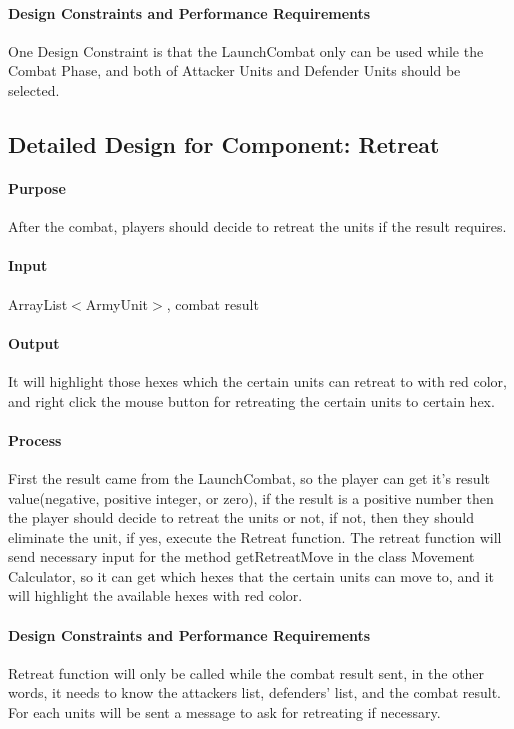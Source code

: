 \documentclass[12pt,a4paper,titlepage]{article}
\begin{document}
\paragraph{Design Constraints and Performance Requirements} 
One Design Constraint is that the LaunchCombat only can be used while the Combat Phase, and both of Attacker Units and Defender Units should be selected. 

\subsection{Detailed Design for Component: Retreat}
\paragraph{Purpose} After the combat, players should decide to retreat the units if the result requires.
\paragraph{Input} ArrayList$<$ArmyUnit$>$, combat result
\paragraph{Output} It will highlight those hexes which the certain units can retreat to with red color, and right click the mouse button for retreating the certain units to certain hex.
\paragraph{Process} First the result came from the LaunchCombat, so the player can get it's result value(negative, positive integer, or zero), if the result is a positive number then the player should decide to retreat the units or not, if not, then they should eliminate the unit, if yes, execute the Retreat function. The retreat function will send necessary input for the method getRetreatMove in the class Movement Calculator, so it can get which hexes that the certain units can move to, and it will highlight the available hexes with red color.
\paragraph{Design Constraints and Performance Requirements} Retreat function will only be called while the combat result sent, in the other words, it needs to know the attackers list, defenders' list, and the combat result. For each units will be sent a message to ask for retreating if necessary.
\end{document}
